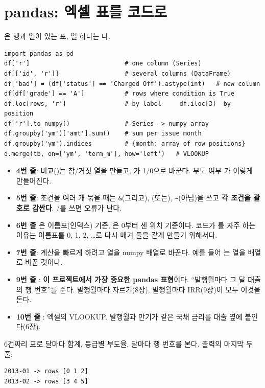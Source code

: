 \section{pandas: 엑셀 표를 코드로}
은 행과 열이 있는 표, 열 하나는 다.
\begin{lstlisting}
import pandas as pd
df['r']                          # one column (Series)
df[['id', 'r']]                  # several columns (DataFrame)
df['bad'] = (df['status'] == 'Charged Off').astype(int)   # new column
df[df['grade'] == 'A']           # rows where condition is True
df.loc[rows, 'r']                # by label     df.iloc[3]  by position
df['r'].to_numpy()               # Series -> numpy array
df.groupby('ym')['amt'].sum()    # sum per issue month
df.groupby('ym').indices         # {month: array of row positions}
d.merge(tb, on=['ym', 'term_m'], how='left')   # VLOOKUP
\end{lstlisting}
\begin{itemize}[leftmargin=*]
\item \textbf{4번 줄}: 비교(\ft{==})는 참/거짓 열을 만들고, 가 1/0으로 바꾼다. 부도 여부 가 이렇게 만들어진다.
\item \textbf{5번 줄}: 조건을 여러 개 묶을 때는 \texttt{\&}(그리고), \ft{|}(또는), \texttt{\textasciitilde}(아님)을 쓰고 \textbf{각 조건을 괄호로 감싼다}. /를 쓰면 오류가 난다.
\item \textbf{6번 줄} 은 이름표(인덱스) 기준, 은 0부터 센 위치 기준이다. 코드가 를 자주 하는 이유는 이름표를 0, 1, 2, \ldots{}로 다시 매겨 둘을 같게 만들기 위해서다.
\item \textbf{7번 줄}: 계산을 빠르게 하려고 열을 numpy 배열로 바꾼다. 예를 들어 는  열을 배열로 바꾼 것이다.
\item \textbf{9번 줄} : \textbf{이 프로젝트에서 가장 중요한 pandas 표현}이다. ``발행월마다 그 달 대출의 행 번호''를 준다. 발행월마다 자르기(8장), 발행월마다 IRR(9장)이 모두 이것을 돈다.
\item \textbf{10번 줄} : 엑셀의 VLOOKUP. 발행월과 만기가 같은 국채 금리를 대출 옆에 붙인다(6장).
\end{itemize}

\begin{workout}
6건짜리 표로 달마다 합계, 등급별 부도율, 달마다 행 번호를 본다. 출력의 마지막 두 줄:
\begin{lstlisting}[style=out]
2013-01 -> rows [0 1 2]
2013-02 -> rows [3 4 5]
\end{lstlisting}
\end{workout}
